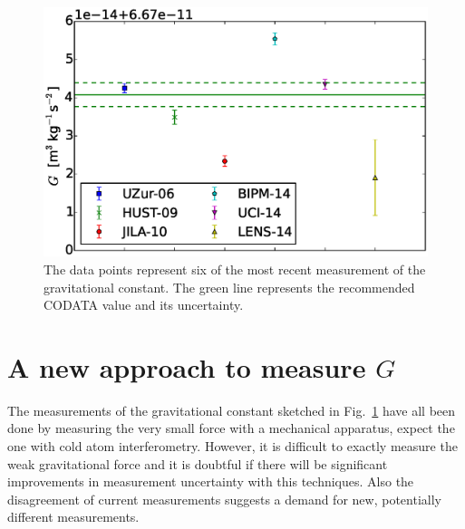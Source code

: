 \documentclass[prb,preprint]{revtex4-1}
\begin{document}





\begin{figure}
	\centering
	\includegraphics[width=\textwidth]{img/plotGmeas}
	\caption{The data points represent six of the most recent measurement of the gravitational constant. The green line represents the recommended CODATA value and its uncertainty.}
	\label{fig:Gmeasurements}
\end{figure}

\section{A new approach to measure $G$}

The measurements of the gravitational constant sketched in Fig.~\ref{fig:Gmeasurements} have all been done by measuring the very small force with a mechanical apparatus, expect the one with cold atom interferometry. However, it is difficult to exactly measure the weak gravitational force and it is doubtful if there will be significant improvements in measurement uncertainty with this techniques. Also the disagreement of current measurements suggests a demand for new, potentially different measurements. \\
\end{document}
